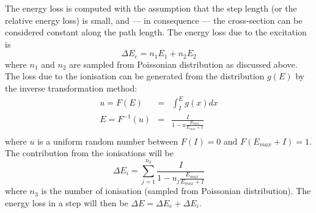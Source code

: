 The energy loss is computed with the assumption that the step length
(or the relative energy loss) is small, and --- in consequence ---
the cross-section can be considered constant along the path length.
The energy loss due to the excitation is
\begin{equation}
\Delta E_e = n_1 E_1 + n_2 E_2
\end{equation}
where $n_1$ and $n_2$ are sampled from Poissonian distribution
as discussed above.
The loss due to the ionisation can be generated from the distribution
$g(E)$ by the inverse transformation method:
\begin{eqnarray}
u = F(E) &  = & \int_{I}^E g(x) dx \nonumber \\
E = F^{-1}(u) & = & \frac{I}{1 - u \frac {E_{max}}{E_{max}+I}} \\
\end{eqnarray}
where $u$ is a uniform random number between $F(I)=0$ and $F(E_{max}+I)=1$.
The contribution from the ionisations will be
\begin{equation}
\Delta E_i  = \sum_{j=1}^{n_3} \frac{I}
              {1 - u_j \frac {E_{max}}{E_{max} + I}}
\end{equation}
where $n_3$ is the number of ionisation (sampled from Poissonian
distribution). The energy loss in a step will then be
$\Delta E = \Delta E_e  + \Delta E_i$.

